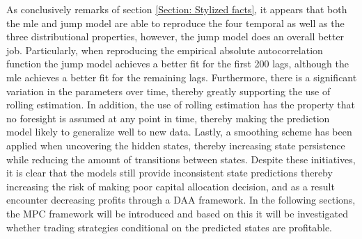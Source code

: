 As conclusively remarks of section \ref{Section: Stylized facts}, it appears that both the mle and jump model are able to reproduce the four temporal as well as the three distributional properties, however, the jump model does an overall better job. Particularly, when reproducing the empirical absolute autocorrelation function the jump model achieves a better fit for the first 200 lags, although the mle achieves a better fit for the remaining lags. Furthermore, there is a significant variation in the parameters over time, thereby greatly supporting the use of rolling estimation. In addition, the use of rolling estimation has the property that no foresight is assumed at any point in time, thereby making the prediction model likely to generalize well to new data. Lastly, a smoothing scheme has been applied when uncovering the hidden states, thereby increasing state persistence while reducing the amount of transitions between states. Despite these initiatives, it is clear that the models still provide inconsistent state predictions thereby increasing the risk of making poor capital allocation decision, and as a result encounter decreasing profits through a DAA framework. In the following sections, the MPC framework will be introduced and based on this it will be investigated whether trading strategies conditional on the predicted states are profitable.
